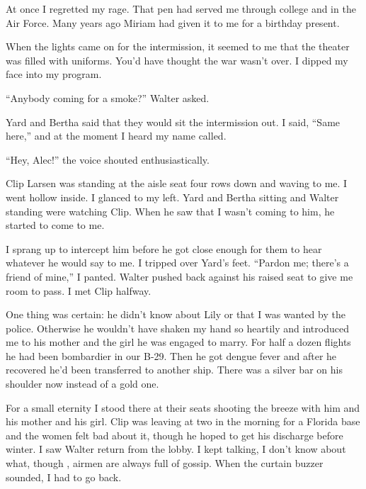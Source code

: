 \documentclass{novel}
\begin{document}
At once I regretted my rage. That pen had served me through college and in the Air Force. Many years ago Miriam had given it to me for a birthday present.

\vspace{2\nbs}
\clearpage
\thispagestyle{empty}


\begin{ChapterStart}
\vspace{3\nbs}
\end{ChapterStart}

When the lights came on for the intermission, it seemed to me that the theater was filled with uniforms. You’d have thought the war wasn’t over. I dipped my face into my program.

“Anybody coming for a smoke?” Walter asked.

Yard and Bertha said that they would sit the intermission out. I said, “Same here,” and at the moment I heard my name called.

“Hey, Alec!” the voice shouted enthusiastically.

Clip Larsen was standing at the aisle seat four rows down and waving to me. I went hollow inside. I glanced to my left. Yard and Bertha sitting and Walter standing were watching Clip. When he saw that I wasn’t coming to him, he started to come to me.

I sprang up to intercept him before he got close enough for them to hear whatever he would say to me. I tripped over Yard’s feet. “Pardon me; there’s a friend of mine,” I panted. Walter pushed back against his raised seat to give me room to pass. I met Clip halfway.

One thing was certain: he didn’t know about Lily or that I was wanted by the police. Otherwise he wouldn’t have shaken my hand so heartily and introduced me to his mother and the girl he was engaged to marry. For half a dozen flights he had been bombardier in our B-29. Then he got dengue fever and after he recovered he’d been transferred to another ship. There was a silver bar on his shoulder now instead of a gold one.

For a small eternity I stood there at their seats shooting the breeze with him and his mother and his girl. Clip was leaving at two in the morning for a Florida base and the women felt bad about it, though he hoped to get his discharge before winter. I saw Walter return from the lobby. I kept talking, I don’t know about what, though , airmen are always full of gossip. When the curtain buzzer sounded, I had to go back.
\end{document}
